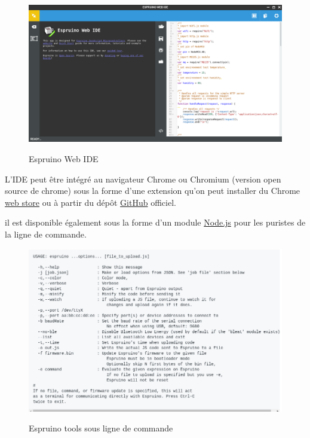 \begin{figure}[H]
  \centering
  \href{https://www.espruino.com/}{
  \includegraphics[width=15cm]{image/web00.png}
  }
  \caption{Espruino Web IDE}
\end{figure}

L'IDE peut être intégré au navigateur Chrome ou Chromium (version open source de chrome) sous la forme d'une extension qu'on peut installer du Chrome \href{https://chrome.google.com/webstore/detail/espruino-web-ide/bleoifhkdalbjfbobjackfdifdneehpo}{web store} ou à partir du dépôt \href{https://github.com/espruino/EspruinoWebIDE}{GitHub}  officiel.  

il est disponible également sous la forme d'un module \href{https://www.npmjs.com/package/espruino}{Node.js}  pour les puristes de la ligne de commande.

\begin{figure}[H]
  \centering
  \href{https://github.com/espruino/EspruinoTools}{
  \includegraphics[width=15cm]{image/espruino_tools.png}
  }
  \caption{Espruino tools sous ligne de commande}
\end{figure}

